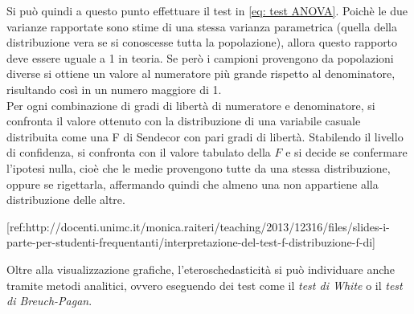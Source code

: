 \documentclass[]{article}
\begin{document}
\begin{tcolorbox}[colback=cyan!5!white, colframe=cyan!75!black, title = ANOVA]
	Si può quindi a questo punto effettuare il test in \eqref{eq: test ANOVA}. Poichè le due varianze rapportate sono stime di una stessa varianza parametrica (quella della distribuzione vera se si conoscesse tutta la popolazione), allora questo rapporto deve essere uguale a 1 in teoria. Se però i campioni provengono da popolazioni diverse si ottiene un valore al numeratore più grande rispetto al denominatore, risultando così in un numero maggiore di 1.\\
	Per ogni combinazione di gradi di libertà di numeratore e denominatore, si confronta il valore ottenuto con la distribuzione di una variabile casuale distribuita come una F di Sendecor con pari gradi di libertà. Stabilendo il livello di confidenza, si confronta con il valore tabulato della $F$ e si decide se confermare l'ipotesi nulla, cioè che le medie provengono tutte da una stessa distribuzione, oppure se rigettarla, affermando quindi che almeno una non appartiene alla distribuzione delle altre.
	
	[ref:http://docenti.unimc.it/monica.raiteri/teaching/2013/12316/files/slides-i-parte-per-studenti-frequentanti/interpretazione-del-test-f-distribuzione-f-di]
\end{tcolorbox}

Oltre alla visualizzazione grafiche, l'eteroschedasticità si può individuare anche tramite metodi analitici, ovvero eseguendo dei test come il \textit{test di White} o il \textit{test di Breuch-Pagan}.
\end{document}
